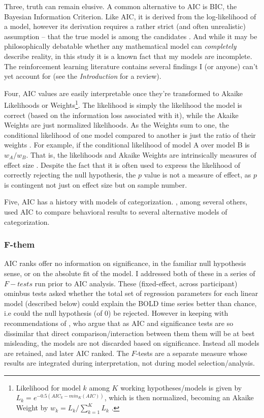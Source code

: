 \documentclass[doc,12pt]{apa}        %
\begin{document}
Three, truth can remain elusive.  A common alternative to AIC is BIC, the Bayesian Information Criterion.  Like AIC, it is derived from the log-likelihood of a model, however its derivation requires a rather strict (and often unrealistic) assumption -- that the true model is among the candidates \cite{Forster:2000p9623}.  And while it may be philosophically debatable whether any mathematical model can \emph{completely} describe reality, in this study it is a known fact that my models are incomplete.  The reinforcement learning literature contains several findings I (or anyone) can't yet account for (see the \emph{Introduction} for a review).  

Four, AIC values are easily interpretable once they're transformed to Akaike Likelihoods or Weights\footnote{
    Likelihood for model $k$ among $K$ working hypotheses/models is given by $L_k = e^{-0.5({AIC}_k - {min}_{K}{(AIC)})}$, which is then normalized, becoming an Akaike Weight by $w_k = L_k / \sum\limits_{k=1}^K L_k$ \cite{Burnham:2004p9621}.}.  The likelihood is simply the likelihood the model is correct (based on the information loss associated with it), while the Akaike Weights are just normalized likelihoods.  As the Weights sum to one, the conditional likelihood of one model compared to another is just the ratio of their weights \cite{Burnham:2004p9621}.  For example, if the conditional likelihood of model A over model B is $w_A/w_B$.  That is, the likelihoods and Akaike Weights are intrinsically measures of effect size \cite{Anderson:2000p9475,Forster:2000p9623}.  Despite the fact that it is often used to express the likelihood of correctly rejecting the null hypothesis, the $p$ value is not a measure of effect, as $p$ is contingent not just on effect size but on sample number.  
    
    Five, AIC has a history with models of categorization. , among several others, used AIC to compare behavioral results to several alternative models of categorization.  

\subsubsection{F-them}
\label{subsub:F}
AIC ranks offer no information on significance, in the familiar null hypothesis sense, or on the absolute fit of the model.  I addressed both of these in a series of $F-tests$ run prior to AIC analysis.  These (fixed-effect, across participant) ominbus tests asked whether the total set of regression parameters for each linear model (described below) could explain the BOLD time series better than chance, i.e could the null hypothesis (of 0) be rejected.  However in keeping with recommendations of , who argue that as AIC and significance tests are so dissimilar that direct comparison/interaction between them them will be at best misleading, the models are not discarded based on significance.  Instead all models are retained, and later AIC ranked.  The $F$-tests are a separate measure whose results are integrated during interpretation, not during model selection/analysis.
\end{document}
